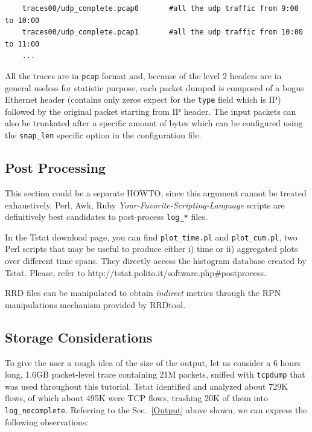 \documentclass[11pt]{article}
\begin{document}
\begin{small}\begin{verbatim}
    traces00/udp_complete.pcap0       #all the udp traffic from 9:00  to 10:00
    traces00/udp_complete.pcap1       #all the udp traffic from 10:00 to 11:00
    ...
\end{verbatim}\end{small} \noindent
All the traces are in \texttt{pcap} format and, because of the level 2 headers are in
general useless for statistic purpose, each packet dumped is composed of a bogus
Ethernet header (contains only zeros expect for the \texttt{type} field which is IP)
followed by the original packet starting from IP header. The input packets
can also be trunkated after a specific amount of bytes which can be configured
using the \texttt{snap\_len} specific option in the configuration file.

\subsection{Post Processing\label{Post_Processing}}


This section could be a separate HOWTO, since this
argument cannot be treated exhaustively. Perl, Awk, Ruby
\textit{Your-Favorite-Scripting-Language} scripts are definitively
best candidates to post-process \texttt{log\_*} files.



In the Tstat download page, you
can find \texttt{plot\_time.pl} and \texttt{plot\_cum.pl}, two Perl scripts that may be useful
to produce either i) time or ii) aggregated plots over different time spans.
They directly access the histogram database created by Tstat.
Please, refer to \textsf{http://tstat.polito.it/software.php\#postprocess}.



RRD files can be manipulated to obtain \textit{indirect} 
metrics through the RPN manipulations mechanism provided 
by RRDtool.

\subsection{Storage Considerations\label{Storage_Considerations}}


To give the user a rough idea of the size of the output,
let us consider a 6 hours long, 1.6GB packet-level trace containing 
21M packets, sniffed with \texttt{tcpdump} that was used throughout this tutorial.
Tstat identified and analyzed about 729K flows, of which about 495K were 
TCP flows, trashing 20K of them into \texttt{log\_nocomplete}.
Referring to the Sec.~\ref{Output} above shown,
we can express the following observations:
\end{document}

